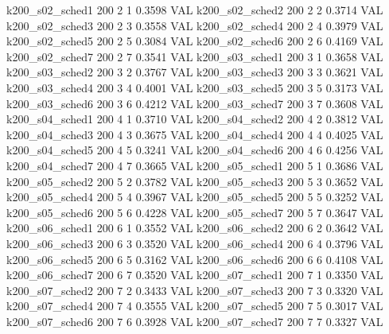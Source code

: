   k200_s02_sched1                  200    2   1    0.3598  VAL
  k200_s02_sched2                  200    2   2    0.3714  VAL
  k200_s02_sched3                  200    2   3    0.3558  VAL
  k200_s02_sched4                  200    2   4    0.3979  VAL
  k200_s02_sched5                  200    2   5    0.3084  VAL
  k200_s02_sched6                  200    2   6    0.4169  VAL
  k200_s02_sched7                  200    2   7    0.3541  VAL
  k200_s03_sched1                  200    3   1    0.3658  VAL
  k200_s03_sched2                  200    3   2    0.3767  VAL
  k200_s03_sched3                  200    3   3    0.3621  VAL
  k200_s03_sched4                  200    3   4    0.4001  VAL
  k200_s03_sched5                  200    3   5    0.3173  VAL
  k200_s03_sched6                  200    3   6    0.4212  VAL
  k200_s03_sched7                  200    3   7    0.3608  VAL
  k200_s04_sched1                  200    4   1    0.3710  VAL
  k200_s04_sched2                  200    4   2    0.3812  VAL
  k200_s04_sched3                  200    4   3    0.3675  VAL
  k200_s04_sched4                  200    4   4    0.4025  VAL
  k200_s04_sched5                  200    4   5    0.3241  VAL
  k200_s04_sched6                  200    4   6    0.4256  VAL
  k200_s04_sched7                  200    4   7    0.3665  VAL
  k200_s05_sched1                  200    5   1    0.3686  VAL
  k200_s05_sched2                  200    5   2    0.3782  VAL
  k200_s05_sched3                  200    5   3    0.3652  VAL
  k200_s05_sched4                  200    5   4    0.3967  VAL
  k200_s05_sched5                  200    5   5    0.3252  VAL
  k200_s05_sched6                  200    5   6    0.4228  VAL
  k200_s05_sched7                  200    5   7    0.3647  VAL
  k200_s06_sched1                  200    6   1    0.3552  VAL
  k200_s06_sched2                  200    6   2    0.3642  VAL
  k200_s06_sched3                  200    6   3    0.3520  VAL
  k200_s06_sched4                  200    6   4    0.3796  VAL
  k200_s06_sched5                  200    6   5    0.3162  VAL
  k200_s06_sched6                  200    6   6    0.4108  VAL
  k200_s06_sched7                  200    6   7    0.3520  VAL
  k200_s07_sched1                  200    7   1    0.3350  VAL
  k200_s07_sched2                  200    7   2    0.3433  VAL
  k200_s07_sched3                  200    7   3    0.3320  VAL
  k200_s07_sched4                  200    7   4    0.3555  VAL
  k200_s07_sched5                  200    7   5    0.3017  VAL
  k200_s07_sched6                  200    7   6    0.3928  VAL
  k200_s07_sched7                  200    7   7    0.3327  VAL
